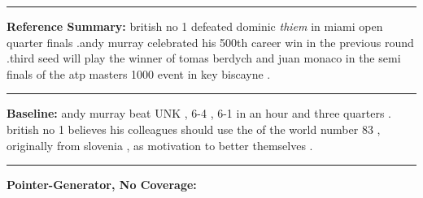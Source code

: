 \documentclass[11pt,a4paper]{article}
\begin{document}
\begin{figure*}
\begin{boxedminipage}{\textwidth}
                                                                            
\newline \rule{\columnwidth}{0.4pt}
\textbf{Reference Summary:} \newline british no 1 defeated dominic \textit{thiem} in miami open quarter finals .\newline andy murray celebrated his 500th career win in the previous round .\newline third seed will play the winner of tomas berdych and juan monaco in the semi finals of the atp masters 1000 event in key biscayne .
\newline \rule{\columnwidth}{0.4pt}
\textbf{Baseline:} \newline
andy murray beat UNK  , 6-4 , 6-1 in an hour and three quarters . \newline
british no 1 believes his colleagues should use the  of the world number 83 , originally from slovenia , as motivation to better themselves .
\newline \rule{\columnwidth}{0.4pt}
\textbf{Pointer-Generator, No Coverage:} \newline

\end{boxedminipage}
\end{figure*}
\end{document}
